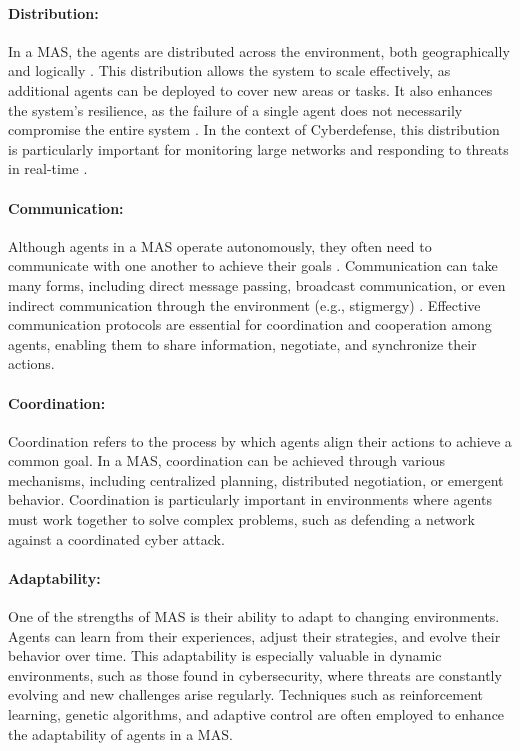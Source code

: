 \paragraph{Distribution:}
In a MAS, the agents are distributed across the environment, both geographically and logically \cite{ferber1999multi}. This distribution allows the system to scale effectively, as additional agents can be deployed to cover new areas or tasks. It also enhances the system's resilience, as the failure of a single agent does not necessarily compromise the entire system \cite{durfee1999distributed}. In the context of Cyberdefense, this distribution is particularly important for monitoring large networks and responding to threats in real-time \cite{shakarian2015cyber}.

\paragraph{Communication:}
Although agents in a MAS operate autonomously, they often need to communicate with one another to achieve their goals \cite{huhns1999multiagent}. Communication can take many forms, including direct message passing, broadcast communication, or even indirect communication through the environment (e.g., stigmergy) \cite{dorigo2000ant}. Effective communication protocols are essential for coordination and cooperation among agents, enabling them to share information, negotiate, and synchronize their actions.

\paragraph{Coordination:}
Coordination refers to the process by which agents align their actions to achieve a common goal. In a MAS, coordination can be achieved through various mechanisms, including centralized planning, distributed negotiation, or emergent behavior. Coordination is particularly important in environments where agents must work together to solve complex problems, such as defending a network against a coordinated cyber attack.

\paragraph{Adaptability:}
One of the strengths of MAS is their ability to adapt to changing environments. Agents can learn from their experiences, adjust their strategies, and evolve their behavior over time. This adaptability is especially valuable in dynamic environments, such as those found in cybersecurity, where threats are constantly evolving and new challenges arise regularly. Techniques such as reinforcement learning, genetic algorithms, and adaptive control are often employed to enhance the adaptability of agents in a MAS.

